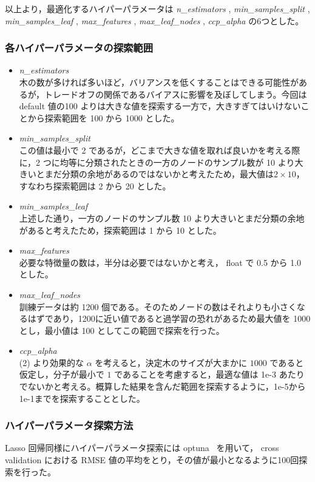 \documentclass[a4j,11pt]{jarticle}
\begin{document}
以上より，最適化するハイパーパラメータは \textit{n\_estimators} , \textit{min\_samples\_split} , \textit{min\_samples\_leaf} , \textit{max\_features} , \textit{max\_leaf\_nodes} , \textit{ccp\_alpha} の6つとした。\\

\subsubsection{各ハイパーパラメータの探索範囲}
\begin{itemize}
\item \textit{n\_estimators}\\
木の数が多ければ多いほど，バリアンスを低くすることはできる可能性があるが，トレードオフの関係であるバイアスに影響を及ぼしてしまう。今回は default 値の100 よりは大きな値を探索する一方で，大きすぎてはいけないことから探索範囲を 100 から 1000 とした。
\item \textit{min\_samples\_split}\\
この値は最小で 2 であるが，どこまで大きな値を取れば良いかを考える際に，2 つに均等に分類されたときの一方のノードのサンプル数が 10 より大きいとまだ分類の余地があるのではないかと考えたため，最大値は$2 \times 10$，すなわち探索範囲は 2 から 20 とした。
\item \textit{min\_samples\_leaf}\\
上述した通り，一方のノードのサンプル数 10 より大きいとまだ分類の余地があると考えたため，探索範囲は 1 から 10 とした。
\item \textit{max\_features}\\
必要な特徴量の数は，半分は必要ではないかと考え， float で 0.5 から 1.0 とした。
\item \textit{max\_leaf\_nodes}\\
訓練データは約 1200 個である。そのためノードの数はそれよりも小さくなるはずであり，1200に近い値であると過学習の恐れがあるため最大値を 1000 とし，最小値は 100 としてこの範囲で探索を行った。\\
\item \textit{ccp\_alpha}\\
(2) より効果的な $\alpha$ を考えると，決定木のサイズが大まかに $1000$ であると仮定し，分子が最小で $1$ であることを考慮すると，最適な値は 1e-3 あたりでないかと考える。概算した結果を含んだ範囲を探索するように，1e-5から1e-1までを探索することとした。
\end{itemize}

\subsubsection{ハイパーパラメータ探索方法} 
 Lasso 回帰同様にハイパーパラメータ探索には optuna ~\cite{optuna}を用いて， cross validation における RMSE 値の平均をとり，その値が最小となるように100回探索を行った。
\end{document}
